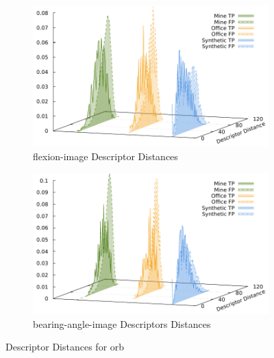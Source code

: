 \begin{figure}[htp]
\begin{subfigure}[t]{0.45\linewidth}
    \includegraphics[width=\linewidth]{chapter06/results/ORB/flexion/descriptor_distances.pdf}%
    \caption{\gls{flexion-image} Descriptor Distances}
\end{subfigure}\quad
\begin{subfigure}[t]{0.45\linewidth}
    \includegraphics[width=\linewidth]{chapter06/results/ORB/bearing/descriptor_distances.pdf}%
    \caption{\gls{bearing-angle-image} Descriptors Distances}
\end{subfigure}
    \caption{Descriptor Distances for \acrshort{orb}}\label{fig:orb_descriptor_distances}
\end{figure}
